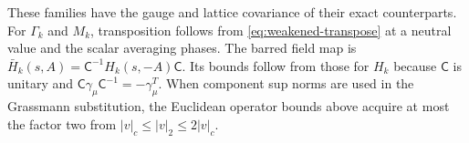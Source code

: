 These families have the gauge and lattice covariance of their exact
counterparts. For $\Gamma_k$ and $M_k$, transposition follows from
\eqref{eq:weakened-transpose} at a neutral value and the scalar
averaging phases. The barred field map is
$\bar H_k(s,A)=\mathsf C^{-1}H_k(s,-A)\mathsf C$.
Its bounds follow from those for $H_k$ because $\mathsf C$ is unitary
and $\mathsf C\gamma_\mu\mathsf C^{-1}=-\gamma_\mu^T$.
When component sup norms are used in the Grassmann substitution,
the Euclidean operator bounds above acquire at most the factor two
from $|v|_c\le|v|_2\le2|v|_c$.

